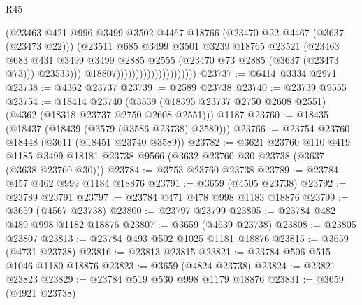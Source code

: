 \begin{lexlean}{R45}
\begin{coremodule}
                                              (@23463
                                                @421
                                                @996
                                                @3499
                                                @3502
                                                @4467
                                                @18766
                                                (@23470 @22 @4467 (@3637 (@23473 @22)))
                                                (@23511
                                                  @685
                                                  @3499
                                                  @3501
                                                  @3239
                                                  @18765
                                                  @23521
                                                  (@23463
                                                    @683
                                                    @431
                                                    @3499
                                                    @3499
                                                    @2885
                                                    @2555
                                                    (@23470 @73 @2885 (@3637 (@23473 @73)))
                                                    @23533)))
                                              @18807)))))))))))))))))))))
@23737 := @6414 @3334 @2971
@23738 := @4362 @23737
@23739 := @2589 @23738
@23740 := @23739 @9555
@23754 := @18414
    @23740
    (@3539 (@18395 @23737 @2750 @2608 @2551) (@4362 (@18318 @23737 @2750 @2608 @2551)))
    @1187
@23760 := @18435 (@18437 (@18439 (@3579 (@3586 @23738) @3589)))
@23766 := @23754 @23760 @18448 (@3611 (@18451 @23740 @3589))
@23782 := @3621
    @23760
    @110
    @419
    @1185
    @3499
    @18181
    @23738
    @9566
    (@3632 @23760 @30 @23738 (@3637 (@3638 @23760 @30)))
@23784 := @3753 @23760 @23738
@23789 := @23784 @457 @462 @999 @1184 @18876
@23791 := @3659 (@4505 @23738)
@23792 := @23789 @23791
@23797 := @23784 @471 @478 @998 @1183 @18876
@23799 := @3659 (@4567 @23738)
@23800 := @23797 @23799
@23805 := @23784 @482 @489 @998 @1182 @18876
@23807 := @3659 (@4639 @23738)
@23808 := @23805 @23807
@23813 := @23784 @493 @502 @1025 @1181 @18876
@23815 := @3659 (@4731 @23738)
@23816 := @23813 @23815
@23821 := @23784 @506 @515 @1046 @1180 @18876
@23823 := @3659 (@4824 @23738)
@23824 := @23821 @23823
@23829 := @23784 @519 @530 @998 @1179 @18876
@23831 := @3659 (@4921 @23738)

\end{coremodule}
\end{lexlean}
